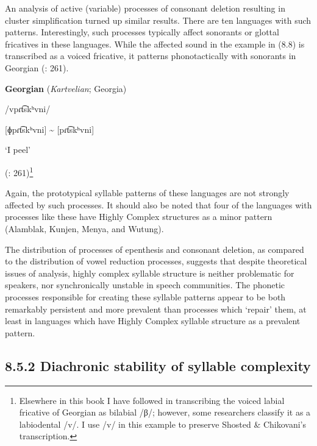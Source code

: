   An analysis of active (variable) processes of consonant deletion resulting in cluster simplification turned up similar results. There are ten languages with such patterns. Interestingly, such processes typically affect sonorants or glottal fricatives in these languages. While the affected sound in the example in (8.8) is transcribed as a voiced fricative, it patterns phonotactically with sonorants in Georgian (\citealt{ShostedChikovani2006}: 261).



\ea\label{ex:(8.8)}
  \textbf{Georgian} (\textit{Kartvelian}; Georgia)



/vpɾt͡skʰvni/



[ɸpɾt͡skʰvni] {\textasciitilde} [pɾt͡skʰvni]



‘I peel’



(\citealt{ShostedChikovani2006}: 261)\footnote{ \textrm{Elsewhere in this book I have followed \citet{Aronson1991} in transcribing the voiced labial fricative of Georgian as bilabial /β/; however, some researchers classify it as a labiodental /v/. I use /v/ in this example to preserve Shosted \& Chikovani’s transcription.}}
\z



Again, the prototypical syllable patterns of these languages are not strongly affected by such processes. It should also be noted that four of the languages with processes like these have Highly Complex structures as a minor pattern (Alamblak, Kunjen, Menya, and Wutung).



  The distribution of processes of epenthesis and consonant deletion, as compared to the distribution of vowel reduction processes, suggests that despite theoretical issues of analysis, highly complex syllable structure is neither problematic for speakers, nor synchronically unstable in speech communities. The phonetic processes responsible for creating these syllable patterns appear to be both remarkably persistent and more prevalent than processes which ‘repair’ them, at least in languages which have Highly Complex syllable structure as a prevalent pattern.


\subsection{8.5.2 Diachronic stability of syllable complexity}

